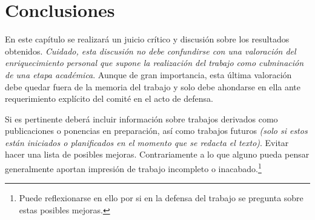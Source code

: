 \chapter{Conclusiones}
\label{cap:Conclusiones}

En este capítulo se realizará un juicio crítico y discusión sobre los resultados obtenidos. \emph{Cuidado, esta discusión no debe confundirse con una valoración del enriquecimiento personal que supone la realización del trabajo como culminación de una etapa académica}. Aunque de gran importancia, esta última valoración debe quedar fuera de la memoria del trabajo y solo debe ahondarse en ella ante requerimiento explícito del comité en el acto de defensa.

Si es pertinente deberá incluir información sobre trabajos derivados como publicaciones o ponencias en preparación, así como trabajos futuros \emph{(solo si estos están iniciados o planificados en el momento que se redacta el texto)}. Evitar hacer una lista de posibles mejoras. Contrariamente a lo que alguno pueda pensar generalmente aportan impresión de trabajo incompleto o inacabado.\footnote{Puede reflexionarse en ello por si en la defensa del trabajo se pregunta sobre estas posibles mejoras.}








